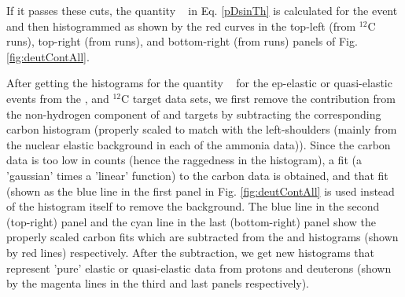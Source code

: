If it passes these cuts, the quantity \Delt~ in Eq. \ref{pDsinTh} is calculated for the event and then histogrammed as shown by the red curves in the top-left (from $^{12}$C runs), top-right (from  runs), and bottom-right (from  runs) panels of Fig. \ref{fig:deutContAll}.


\begin{comment}
\begin{figure}[hbt]
\centerline{\texttt{[image: TechNotes/Figures/deutContamPlot.eps]}}
\caption[Enter caption here for the lists]{Enter caption here}
\label{fig:deutCont}
\end{figure}
\end{comment}

After getting the histograms for the quantity \Delt~  for the ep-elastic or %
quasi-elastic events from the ,  and $^{12}$C target data sets, we first remove the contribution from the non-hydrogen component of  and  targets by subtracting the corresponding carbon histogram (properly scaled to match with the left-shoulders (mainly from the nuclear elastic background in each of the ammonia data)). Since the carbon data is too low in counts (hence the raggedness in the histogram), %
a fit (a 'gaussian' times a 'linear' function) to the carbon data is obtained, and that fit (shown as the blue line in the first panel in Fig. \ref{fig:deutContAll} is used instead of the histogram itself to remove the background. The blue line in the second (top-right) panel and the cyan  line in the last (bottom-right) panel show the properly scaled carbon fits which are subtracted from the  and  histograms (shown by red lines) respectively. After the subtraction, we get new histograms that represent 'pure' elastic or quasi-elastic data from protons and deuterons (shown by the magenta lines in the third and last panels respectively).


